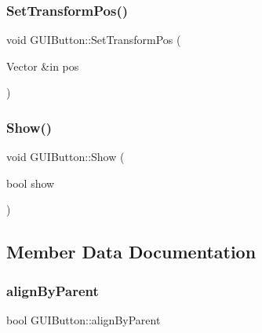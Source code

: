 \hypertarget{class_g_u_i_button_a79055c801ba8bf114e6c09ff684afda3}{}\label{class_g_u_i_button_a79055c801ba8bf114e6c09ff684afda3} 
\subsubsection{\texorpdfstring{Set\+Transform\+Pos()}{SetTransformPos()}}
{\footnotesize\ttfamily void G\+U\+I\+Button\+::\+Set\+Transform\+Pos (\begin{DoxyParamCaption}\item[{Vector \&in}]{pos }\end{DoxyParamCaption})}

\hypertarget{class_g_u_i_button_ab97b9d35108671239706fcc98fbb829f}{}\label{class_g_u_i_button_ab97b9d35108671239706fcc98fbb829f} 
\subsubsection{\texorpdfstring{Show()}{Show()}}
{\footnotesize\ttfamily void G\+U\+I\+Button\+::\+Show (\begin{DoxyParamCaption}\item[{bool}]{show }\end{DoxyParamCaption})}



\subsection{Member Data Documentation}
\hypertarget{class_g_u_i_button_a3dc5b32e7768aa219a0c3e85d405814b}{}\label{class_g_u_i_button_a3dc5b32e7768aa219a0c3e85d405814b} 
\subsubsection{\texorpdfstring{align\+By\+Parent}{alignByParent}}
{\footnotesize\ttfamily bool G\+U\+I\+Button\+::align\+By\+Parent}

\hypertarget{class_g_u_i_button_a90bbc4fe0c242a4fa2ae4a28e826748a}{}\label{class_g_u_i_button_a90bbc4fe0c242a4fa2ae4a28e826748a} 
